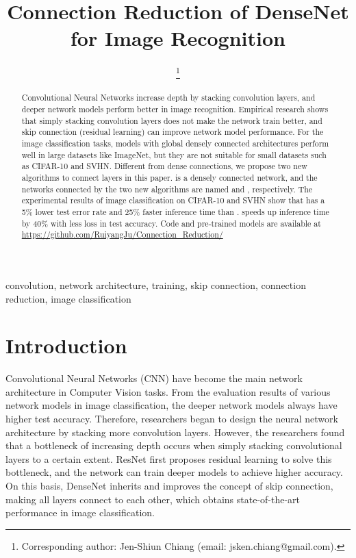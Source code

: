 \documentclass[conference]{IEEEtran}
\begin{document}
\title{Connection Reduction of DenseNet for Image Recognition\\
}

\author{
\thanks{Corresponding author: Jen-Shiun Chiang (email: jsken.chiang@gmail.com).}}

\maketitle

\begin{abstract}
Convolutional Neural Networks increase depth by stacking convolution layers, and deeper network models perform better in image recognition. Empirical research shows that simply stacking convolution layers does not make the network train better, and skip connection (residual learning) can improve network model performance. For the image classification tasks, models with global densely connected architectures perform well in large datasets like ImageNet, but they are not suitable for small datasets such as CIFAR-10 and SVHN. Different from dense connections, we propose two new algorithms to connect layers in this paper.  is a densely connected network, and the networks connected by the two new algorithms are named  and , respectively. The experimental results of image classification on CIFAR-10 and SVHN show that  has a 5\% lower test error rate and 25\% faster inference time than .  speeds up inference time by 40\% with less loss in test accuracy. Code and pre-trained models are available at \url{https://github.com/RuiyangJu/Connection_Reduction/}
\end{abstract}

\begin{IEEEkeywords}
convolution, network architecture, training, skip connection, connection reduction, image classification
\end{IEEEkeywords}

\section{Introduction}
Convolutional Neural Networks (CNN) have become the main network architecture in Computer Vision tasks. From the evaluation results of various network models in image classification, the deeper network models always have higher test accuracy. Therefore, researchers began to design the neural network architecture by stacking more convolution layers. However, the researchers found that a bottleneck of increasing depth occurs when simply stacking convolutional layers to a certain extent. ResNet \cite{he2016deep} first proposes residual learning to solve this bottleneck, and the network can train deeper models to achieve higher accuracy. On this basis, DenseNet \cite{huang2017densely} inherits and improves the concept of skip connection, making all layers connect to each other, which obtains state-of-the-art performance in image classification.
\end{document}
